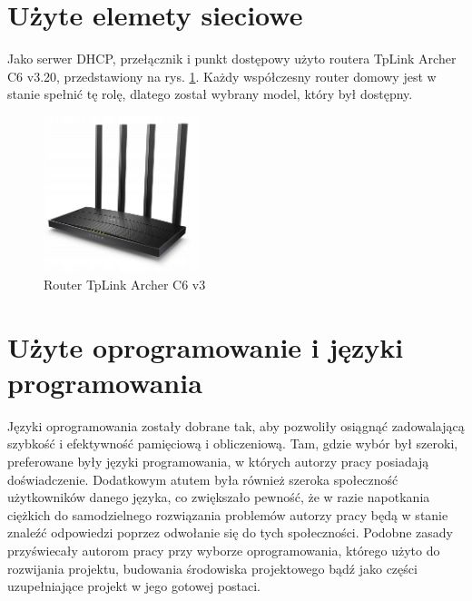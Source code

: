 \documentclass[12pt,oneside,a4paper]{book}
\theoremstyle{break}
\begin{document}
\section{Użyte elemety sieciowe}
Jako serwer DHCP, przełącznik i punkt dostępowy użyto routera TpLink Archer C6 v3.20,
przedstawiony na rys. \ref{rys:router}.
Każdy współczesny router domowy jest w stanie spełnić tę rolę, dlatego
został wybrany model, który był dostępny.

\begin{figure}[H]
    \begin{center}
        \includegraphics[width=0.4\textwidth]{router.png}        
        \caption{Router TpLink Archer C6 v3}        
        \label{rys:router}
    \end{center}
\end{figure}

\section{Użyte oprogramowanie i języki programowania}
Języki oprogramowania zostały dobrane tak, aby pozwoliły osiągnąć zadowalającą szybkość
i efektywność pamięciową i obliczeniową. Tam, gdzie wybór był szeroki, preferowane były 
języki programowania, w których autorzy pracy posiadają doświadczenie. Dodatkowym atutem 
była również szeroka społeczność użytkowników danego języka, co zwiększało pewność, że 
w razie napotkania ciężkich do samodzielnego rozwiązania problemów
autorzy pracy będą w stanie znaleźć odpowiedzi poprzez odwołanie się do tych społeczności.
Podobne zasady przyświecały autorom pracy przy wyborze oprogramowania, którego użyto do
rozwijania projektu, budowania środowiska projektowego bądź jako części uzupełniające 
projekt w jego gotowej postaci.
\end{document}
